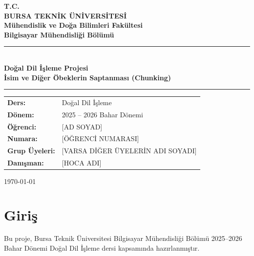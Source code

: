 \documentclass[12pt,a4paper]{article}
\begin{document}
\begin{titlepage}
    \centering
    \vspace*{1cm}

    {\Large \textbf{T.C.}\\[0.3em]
     \textbf{BURSA TEKNİK ÜNİVERSİTESİ}\\[0.3em]
     \textbf{Mühendislik ve Doğa Bilimleri Fakültesi}\\[0.3em]
     \textbf{Bilgisayar Mühendisliği Bölümü}}

    \vspace{1.5cm}
    \vspace{2cm}

    \rule{\linewidth}{1pt}\\[0.5em]
    {\LARGE \textbf{Doğal Dil İşleme Projesi}}\\[0.5em]
    {\Large \textbf{İsim ve Diğer Öbeklerin Saptanması (Chunking)}}\\[0.3em]
    \rule{\linewidth}{1pt}

    \vspace{1.5cm}

    \begin{tabular}{ll}
        \textbf{Ders:}    & Doğal Dil İşleme \\[0.5em]
        \textbf{Dönem:}   & 2025 -- 2026 Bahar Dönemi \\[0.5em]
        \textbf{Öğrenci:} & [AD SOYAD] \\[0.5em]
        \textbf{Numara:}  & [ÖĞRENCİ NUMARASI] \\[0.5em]
        \textbf{Grup Üyeleri:} & [VARSA DİĞER ÜYELERİN ADI SOYADI] \\[0.5em]
        \textbf{Danışman:}& [HOCA ADI] \\
    \end{tabular}

    \vfill
    {\large \today}
\end{titlepage}


\section{Giriş}

Bu proje, Bursa Teknik Üniversitesi Bilgisayar Mühendisliği Bölümü
2025--2026 Bahar Dönemi Doğal Dil İşleme dersi kapsamında hazırlanmıştır.
\end{document}
